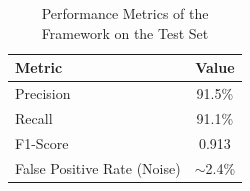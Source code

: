 \documentclass[conference]{IEEEtran}
\begin{document}
        

        
        \begin{table}[htbp]
            \caption{Performance Metrics of the Framework on the Test Set}
            \begin{center}
                \begin{tabular}{|l|c|}
                    \hline
                    \textbf{Metric}                 & \textbf{Value} \\
                    \hline
                    Precision                       & 91.5\%          \\
                    Recall                          & 91.1\%          \\
                    F1-Score                        & 0.913          \\
                    False Positive Rate (Noise)     & $\sim$2.4\%      \\
                    \hline
                \end{tabular}
                \label{tab:performance_summary}
            \end{center}
        \end{table}
        
\end{document}

